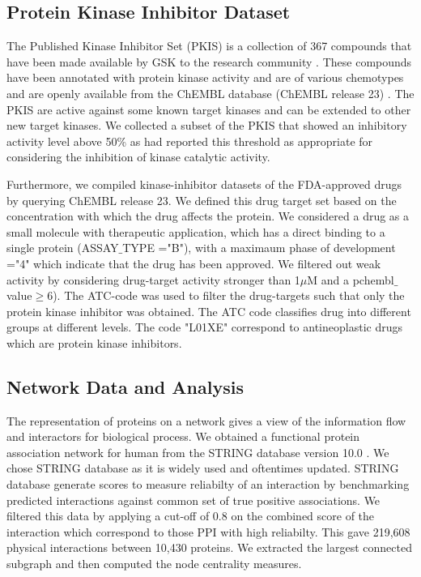 \documentclass[a4paper, 11pt]{report}
\begin{document}
\subsection{Protein Kinase Inhibitor Dataset}
The Published Kinase Inhibitor Set (PKIS) is a collection of 367 compounds that have been made available by GSK to the research community \cite{dranchak2013profile, knapp2013public}. These compounds have been annotated with protein kinase  activity \cite{knapp2013public} and are of various chemotypes and are openly available from the ChEMBL database (ChEMBL release 23) \cite{gaulton2016chembl}. The PKIS are active against some known target kinases and can be extended to other new target kinases. We collected a subset of the PKIS that showed an inhibitory activity level above 50\% as \cite{dranchak2013profile,  anastassiadis2011comprehensive} had reported this threshold as appropriate for considering the inhibition of kinase catalytic activity.\par
Furthermore, we compiled kinase-inhibitor datasets of the FDA-approved drugs by querying ChEMBL release 23. We defined this drug target set based on the concentration with which the drug affects the protein. We considered a drug as a small molecule with therapeutic application, which has a direct binding to a single protein (ASSAY$\_$TYPE ="B"), with a maximaum phase of development ="4" which indicate that the drug has been approved. We filtered out weak activity by considering drug-target activity stronger than 1$\mu$M and a pchembl$\_$value$\geq$6). The ATC-code was used to filter the drug-targets such that only the protein kinase inhibitor was obtained. The ATC code classifies drug into different groups at different levels. The code "L01XE" correspond to antineoplastic drugs which are protein kinase inhibitors.
\subsection{Network Data and Analysis}
The representation of proteins on a network gives a view of the information flow and interactors for biological process. We obtained a functional protein association network for human from the STRING database version 10.0 \cite{szklarczyk2014string}. We chose STRING database as it is widely used and oftentimes updated. STRING database generate scores  to measure reliabilty of an interaction by benchmarking predicted interactions against common set of true positive associations. We filtered this data by applying a cut-off of 0.8 on the combined score of the interaction which correspond to those PPI with high reliabilty. This gave 219,608 physical interactions between 10,430 proteins. We extracted the largest connected subgraph and then computed the node centrality measures.
\end{document}
